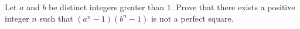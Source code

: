 Let $a$ and $b$ be distinct integers greater than $1$. Prove that there exists a positive integer $n$ such that $(a^{n} - 1)(b^{n} - 1)$ is not a perfect square.
